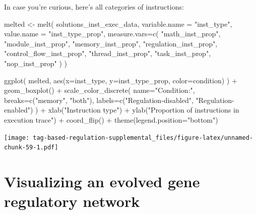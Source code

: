 \documentclass[
]{book}
\newenvironment{Shaded}{\begin{snugshade}}{\end{snugshade}}
\newcommand{\AttributeTok}[1]{\textcolor[rgb]{0.77,0.63,0.00}{#1}}
\newcommand{\FunctionTok}[1]{\textcolor[rgb]{0.00,0.00,0.00}{#1}}
\newcommand{\NormalTok}[1]{#1}
\newcommand{\OtherTok}[1]{\textcolor[rgb]{0.56,0.35,0.01}{#1}}
\newcommand{\SpecialCharTok}[1]{\textcolor[rgb]{0.00,0.00,0.00}{#1}}
\newcommand{\StringTok}[1]{\textcolor[rgb]{0.31,0.60,0.02}{#1}}
\begin{document}
In case you're curious, here's all categories of instructions:

\begin{Shaded}
\begin{Highlighting}[]
\NormalTok{melted }\OtherTok{\textless{}{-}} \FunctionTok{melt}\NormalTok{(}
\NormalTok{  solutions\_inst\_exec\_data,}
  \AttributeTok{variable.name =} \StringTok{"inst\_type"}\NormalTok{,}
  \AttributeTok{value.name =} \StringTok{"inst\_type\_prop"}\NormalTok{,}
  \AttributeTok{measure.vars=}\FunctionTok{c}\NormalTok{(}
    \StringTok{"math\_inst\_prop"}\NormalTok{,}
    \StringTok{"module\_inst\_prop"}\NormalTok{,}
    \StringTok{"memory\_inst\_prop"}\NormalTok{,}
    \StringTok{"regulation\_inst\_prop"}\NormalTok{,}
    \StringTok{"control\_flow\_inst\_prop"}\NormalTok{,}
    \StringTok{"thread\_inst\_prop"}\NormalTok{,}
    \StringTok{"task\_inst\_prop"}\NormalTok{,}
    \StringTok{"nop\_inst\_prop"}
\NormalTok{  )}
\NormalTok{)}

\FunctionTok{ggplot}\NormalTok{( melted, }\FunctionTok{aes}\NormalTok{(}\AttributeTok{x=}\NormalTok{inst\_type, }\AttributeTok{y=}\NormalTok{inst\_type\_prop, }\AttributeTok{color=}\NormalTok{condition) ) }\SpecialCharTok{+}
  \FunctionTok{geom\_boxplot}\NormalTok{() }\SpecialCharTok{+}
  \FunctionTok{scale\_color\_discrete}\NormalTok{(}
    \AttributeTok{name=}\StringTok{"Condition:"}\NormalTok{,}
    \AttributeTok{breaks=}\FunctionTok{c}\NormalTok{(}\StringTok{"memory"}\NormalTok{, }\StringTok{"both"}\NormalTok{),}
    \AttributeTok{labels=}\FunctionTok{c}\NormalTok{(}\StringTok{"Regulation{-}disabled"}\NormalTok{, }\StringTok{"Regulation{-}enabled"}\NormalTok{)}
\NormalTok{  ) }\SpecialCharTok{+}
  \FunctionTok{xlab}\NormalTok{(}\StringTok{"Instruction type"}\NormalTok{) }\SpecialCharTok{+}
  \FunctionTok{ylab}\NormalTok{(}\StringTok{"Proportion of instructions in execution trace"}\NormalTok{) }\SpecialCharTok{+}
  \FunctionTok{coord\_flip}\NormalTok{() }\SpecialCharTok{+}
  \FunctionTok{theme}\NormalTok{(}\AttributeTok{legend.position=}\StringTok{"bottom"}\NormalTok{)}
\end{Highlighting}
\end{Shaded}

\texttt{[image: tag-based-regulation-supplemental\_files/figure-latex/unnamed-chunk-59-1.pdf]}

\hypertarget{visualizing-an-evolved-gene-regulatory-network}{%
\section{Visualizing an evolved gene regulatory network}\label{visualizing-an-evolved-gene-regulatory-network}}
\end{document}
